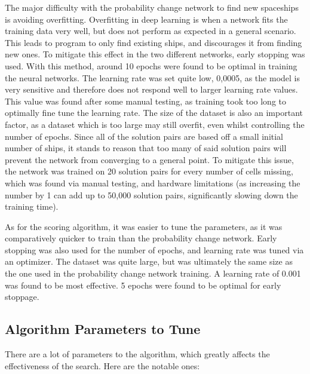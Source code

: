 \documentclass{l4proj}
\begin{document}
The major difficulty with the probability change network to find new spaceships is avoiding overfitting. Overfitting in deep learning is when a network fits the training data very well, but does not perform as expected in a general scenario. This leads to program to only find existing ships, and discourages it from finding new ones. To mitigate this effect in the two different networks, early stopping was used. With this method, around 10 epochs were found to be optimal in training the neural networks. The learning rate was set quite low, 0,0005, as the model is very sensitive and therefore does not respond well to larger learning rate values. This value was found after some manual testing, as training took too long to optimally fine tune the learning rate. The size of the dataset is also an important factor, as a dataset which is too large may still overfit, even whilst controlling the number of epochs. Since all of the solution pairs are based off a small initial number of ships, it stands to reason that too many of said solution pairs will prevent the network from converging to a general point. To mitigate this issue, the network was trained on 20 solution pairs for every number of cells missing, which was found via manual testing, and hardware limitations (as increasing the number by 1 can add up to 50,000 solution pairs, significantly slowing down the training time).

As for the scoring algorithm, it was easier to tune the parameters, as it was comparatively quicker to train than the probability change network. Early stopping was also used for the number of epochs, and learning rate was tuned via an optimizer. The dataset was quite large, but was ultimately the same size as the one used in the probability change network training. A learning rate of 0.001 was found to be most effective. 5 epochs were found to be optimal for early stoppage.

\subsection{Algorithm Parameters to Tune}

There are a lot of parameters to the algorithm, which greatly affects the effectiveness of the search. Here are the notable ones:
 
\end{document}
